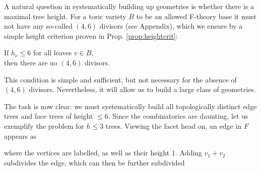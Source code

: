 \documentclass[aps,prl,twocolumn, superscriptaddress,groupedaddress,nofootinbib]{revtex4-1}
\begin{document}
A natural question
in systematically building up geometries is whether there is
a maximal tree height. For a toric variety $B$ to be an allowed
F-theory base it must not have any so-called $(4,6)$ divisors (see Appendix), which
we ensure by a simple height criterion proven in Prop. \ref{prop:heightcrit}:
\begin{center}
If $h_v\leq 6$ for all leaves $v\in B$, \\ then there are no $(4,6)$
divisors.
\end{center}
This condition is simple and sufficient, but not necessary
for the absence of $(4,6)$ divisors. Nevertheless, it
will allow us to build a large class of geometries.


\vspace{.5cm}
The task is now clear: we must systematically build  all
topologically distinct edge trees and face trees of height 
$\leq 6$. Since the combinatorics are daunting, let us
exemplify the problem for $h\leq 3$ trees. Viewing the
facet head on, an edge in $F$ appears as 
\begin{center}
\end{center}
where the vertices are labelled, as well as their height $1$.
Adding $v_1+v_2$ subdivides the
edge, which can then be further subdivided
\end{document}
